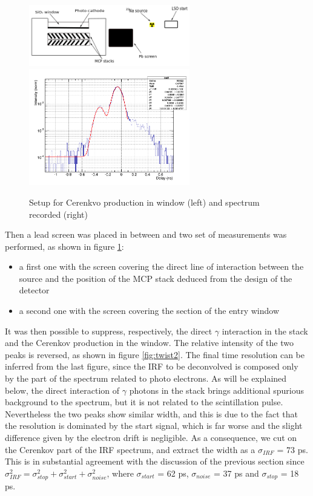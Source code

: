 \begin{figure}[htbp]
\begin{center}
\includegraphics[width=7cm]{../Pictures/Chapter_8/screen_irf.png}
\includegraphics[width=7cm]{../Pictures/Chapter_8/turn_2.png}
\end{center}
\caption[Setup for Cerenkov production in the window]{Setup for Cerenkvo production in window (left) and spectrum recorded (right)}
\label{fig:twist1}
\end{figure}
Then a lead screen was placed in between and two set of measurements was performed, as shown in figure \ref{fig:twist1}:
\begin{itemize}
\item a first one with the screen covering the direct line of interaction between the source and the position of the MCP stack deduced from the design of the detector
\item a second one with the screen covering the section of the entry window
\end{itemize}
It was then possible to suppress, respectively, the direct $\gamma$ interaction in the stack and the Cerenkov production in the window. The relative intensity of the two peaks is reversed, as shown in figure \ref{fig:twist2}. 
The final time resolution can be inferred from the 
last figure, since the IRF to be deconvolved is composed only by the part of the spectrum related to photo electrons. As will be explained below, the direct interaction of $\gamma$ photons in the stack brings additional spurious background to the spectrum, but it is not related to the scintillation pulse. Nevertheless the two peaks show similar width, and this is due to the fact that the resolution is dominated by the start signal, which is far worse and the slight difference given by the electron drift is negligible.
As a consequence, we cut on the Cerenkov part of the IRF spectrum, and extract the width as a $\sigma _{IRF}$ = 73 ps. This is in substantial agreement with the discussion of the previous section since $\sigma _{IRF}^{2} = \sigma _{stop}^{2} + \sigma _{start}^{2} + \sigma _{noise}^{2}$, where $\sigma _{start}$ = 62 ps, $\sigma _{noise}$ = 37 ps and $\sigma _{stop}$ = 18 ps.

